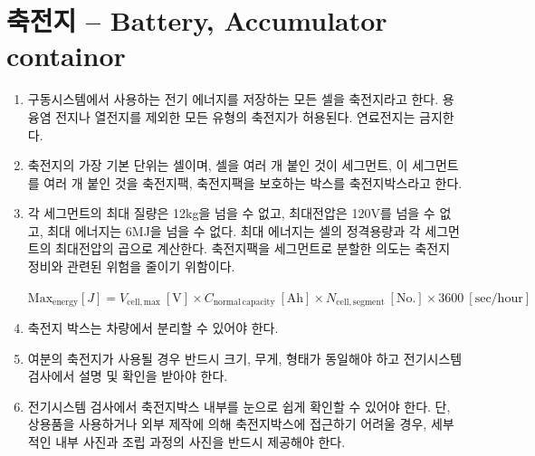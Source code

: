\documentclass[final,a4paper,10pt]{report}
\begin{document}
\section{축전지 – Battery, Accumulator containor}\label{rule:formula-technical.accumulator-container} \label{section:축전지}
\begin{enumerate}
  \item\label{rule:formula-technical.accumulator-container.permitted-cell-chemistries} 구동시스템에서 사용하는 전기 에너지를 저장하는 모든 셀을 축전지라고 한다. 용융염 전지나 열전지를 제외한 모든 유형의 축전지가 허용된다. 연료전지는 금지한다.
  \item\label{rule:formula-technical.accumulator-container.terminology-hierarchy} 축전지의 가장 기본 단위는 셀이며, 셀을 여러 개 붙인 것이 세그먼트, 이 세그먼트를 여러 개 붙인 것을 축전지팩, 축전지팩을 보호하는 박스를 축전지박스라고 한다.
  \item\label{rule:formula-technical.accumulator-container.mass-voltage-energy-caps} 각 세그먼트의 최대 질량은 12kg을 넘을 수 없고, 최대전압은 120V를 넘을 수 없고, 최대 에너지는 6MJ을 넘을 수 없다. 최대 에너지는 셀의 정격용량과 각 세그먼트의 최대전압의 곱으로 계산한다. 축전지팩을 세그먼트로 분할한 의도는 축전지 정비와 관련된 위험을 줄이기 위함이다.

  \label{item:세그먼트 제한}
          $\mathrm{Max}_\mathrm{energy} [J] = V_{\mathrm{cell,max}}\ [\mathrm{V}] \times C_{\mathrm{normal\ capacity}}\ [\mathrm{Ah}] \times N_{\mathrm{cell,segment}}\ [\mathrm{No.}] \times 3600\ [\mathrm{sec/hour}]$
      \item\label{rule:formula-technical.accumulator-container.removable} 축전지 박스는 차량에서 분리할 수 있어야 한다.
  \item\label{rule:formula-technical.accumulator-container.spare-identical-and-verified} 여분의 축전지가 사용될 경우 반드시 크기, 무게, 형태가 동일해야 하고 전기시스템 검사에서 설명 및 확인을 받아야 한다.
  \item\label{rule:formula-technical.accumulator-container.visual-access-or-photos} 전기시스템 검사에서 축전지박스 내부를 눈으로 쉽게 확인할 수 있어야 한다. 단, 상용품을 사용하거나 외부 제작에 의해 축전지박스에 접근하기 어려울 경우, 세부적인 내부 사진과 조립 과정의 사진을 반드시 제공해야 한다.


\end{enumerate}
\end{document}
